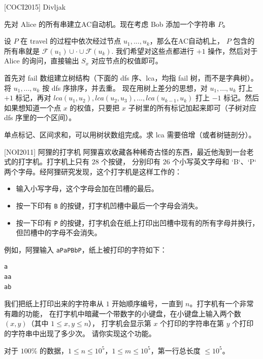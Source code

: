 \documentclass{beamer}
\begin{document}
\begin{frame}[fragile]{[COCI2015] Divljak}
    \footnotesize

    先对 Alice 的所有串建立AC自动机。现在考虑 Bob 添加一个字符串 $P$。

    \vspace{1em}\pause
    设 $P$ 在 travel 的过程中依次经过节点 $u_1,...,u_k$，那么在AC自动机上，
    $P$ 包含的所有串就是 $\mathcal{F}(u_1)\cup\cdot\cup \mathcal{F}(u_k)$.
    我们希望对这些点都进行 $+1$ 操作，然后对于 Alice 的询问，直接输出 $S_x$ 对应节点的权值即可。

    \vspace{1em}\pause
    首先对 fail 数组建立树结构（下面的 dfs 序、lca，均指 fail 树，而不是字典树）。
    将 $u_1,...,u_k$ 按 dfs 序排序，并去重。
    现在用树上差分的思想，对 $u_1,...,u_k$ 打上 $+1$ 标记，再对 $lca(u_1,u_2), lca(u_2,u_3),..., lca(u_{k-1},u_k)$
    打上 $-1$ 标记。然后如果想知道一个点 $x$ 的权值，只要把 $x$ 子树里的所有标记加起来即可（子树对应 dfs 序里的一个区间）。

    \vspace{1em}\pause
    单点标记、区间求和，可以用树状数组完成。求 lca 需要倍增（或者树链剖分）。
\end{frame}

\begin{frame}[fragile]{[NOI2011] 阿狸的打字机}
    \footnotesize    
    阿狸喜欢收藏各种稀奇古怪的东西，最近他淘到一台老式的打字机。打字机上只有 $28$ 个按键，
    分别印有 $26$ 个小写英文字母和 `B`、`P` 两个字母。经阿狸研究发现，这个打字机是这样工作的：
    \begin{itemize}
        \item 输入小写字母，这个字母会加在凹槽的最后。
        \item 按一下印有 \verb|B| 的按键，打字机凹槽中最后一个字母会消失。
        \item 按一下印有 \verb|P| 的按键，打字机会在纸上打印出凹槽中现有的所有字母并换行，但凹槽中的字母不会消失。
    \end{itemize}
    例如，阿狸输入 \verb|aPaPBbP|，纸上被打印的字符如下：
\begin{lstlisting}
a
aa
ab
\end{lstlisting}
    我们把纸上打印出来的字符串从 $1$ 开始顺序编号，一直到 $n$。打字机有一个非常有趣的功能，
    在打字机中暗藏一个带数字的小键盘，在小键盘上输入两个数 $(x,y)$（其中 $1\leq x,y\leq n$），
    打字机会显示第 $x$ 个打印的字符串在第 $y$ 个打印的字符串中出现了多少次。
    请你实现这个功能。

    \vspace{.5em}
    对于 $100\%$ 的数据，$1\leq n\leq 10^5$，$1\leq m\leq10^5$，第一行总长度 $\leq 10^5$。
\end{frame}
\end{document}
